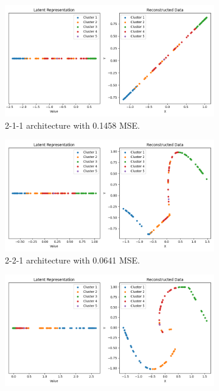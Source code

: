 \begin{figure}[htb]
  \centering
  \begin{subfigure}[b]{0.49\textwidth}
    \centering
    \includegraphics[width=\linewidth]{images/RQ1/2-1-1_0.1458.png}
    \caption{2-1-1 architecture with \textcolor{red!100!black}{0.1458} MSE.}
    \label{fig:2-1-1}
  \end{subfigure}
  \hfill
  \begin{subfigure}[b]{0.49\textwidth}
    \centering
    \includegraphics[width=\linewidth]{images/RQ1/2-2-1_0.0641.png}
    \caption{2-2-1 architecture with \textcolor{red!40!black}{0.0641} MSE.}
    \label{fig:2-2-1}
  \end{subfigure}
  \hfill
  \begin{subfigure}[b]{0.49\textwidth}
    \centering
    \includegraphics[width=\linewidth]{images/RQ1/2-4-1_0.0171.png}

\end{subfigure}
\end{figure}

